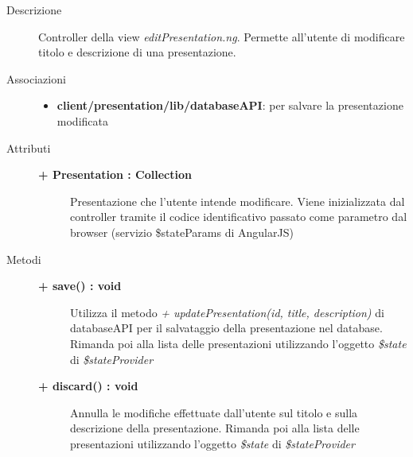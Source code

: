 \begin{description}
\item[Descrizione] \hfill
	Controller della view \textit{editPresentation.ng}. Permette all'utente di modificare titolo e descrizione di una presentazione.
	

\item[Associazioni] \hfill
	\begin{itemize}
		\item \textbf{client/presentation/lib/databaseAPI}: per salvare la presentazione modificata
	\end{itemize}

	
\item[Attributi] \hfill
	\begin{description}
		\item[\textbf{+ Presentation : Collection			}] \hfill
			Presentazione che l'utente intende modificare. Viene inizializzata dal controller tramite il codice identificativo passato come parametro dal browser (servizio \$stateParams di AngularJS)
	\end{description}
	
	
\item[Metodi] \hfill

	\begin{description}
		\item[\textbf{\color{blue}+ save() : void			}] \hfill
			Utilizza il metodo \textit{+ updatePresentation(id, title, description)} di databaseAPI per il salvataggio della presentazione nel database. Rimanda poi alla lista delle presentazioni utilizzando l'oggetto \textit{\$state} di \textit{\$stateProvider}
	\end{description}
	
	\begin{description}
		\item[\textbf{\color{blue}+ discard() : void			}] \hfill
			Annulla le modifiche effettuate dall'utente sul titolo e sulla descrizione della presentazione. Rimanda poi alla lista delle presentazioni utilizzando l'oggetto \textit{\$state} di \textit{\$stateProvider}
	\end{description}
	
	
	
\end{description}

